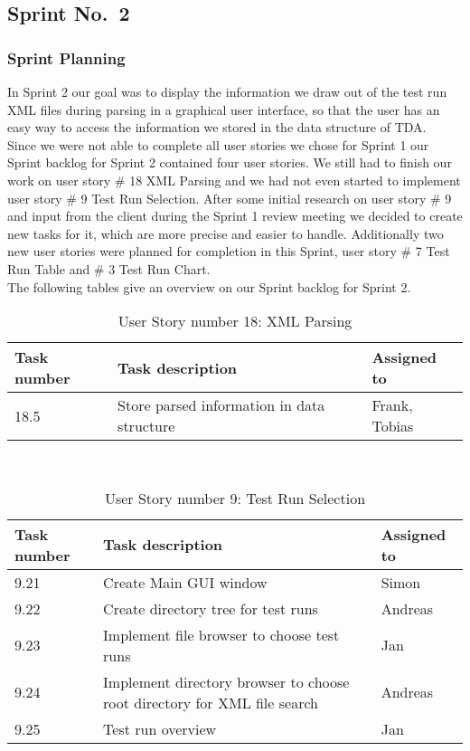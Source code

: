 \subsection{Sprint No.~2}

\subsubsection*{Sprint Planning}

In Sprint 2 our goal was to display the information we draw out of the test run XML files during parsing in a graphical user interface, so that the user has an easy way to access the information we stored in the data structure of TDA. \\ 
Since we were not able to complete all user stories we chose for Sprint 1 our Sprint backlog for Sprint 2 contained four user stories. We still had to finish our work on user story \# 18 XML Parsing and we had not even started to implement user story \# 9 Test Run Selection. After some initial research on user story \# 9 and input from the client during the Sprint 1 review meeting we decided to create new tasks for it, which are more precise and easier to handle. Additionally two new user stories were planned for completion in this Sprint, user story \# 7 Test Run Table and \# 3 Test Run Chart. \\ 
The following tables give an overview on our Sprint backlog for Sprint 2. \\ 

\newpage 

\begin{table}[h]
  \caption{User Story number 18: XML Parsing}
  \label{US_Parsing2}
  \centering
  \begin{tabular}{p{1.5cm}|p{9cm}|p{3cm}|}
  	Task number & Task description & Assigned to \\ 
  	\hline
  	\hline
  	18.5 & Store parsed information in data structure & Frank, Tobias \\ 
  	\hline
  \end{tabular}
\end{table} 

\ \\

\begin{table}[h]
  \caption{User Story number 9: Test Run Selection}
  \label{US_Selection2}
  \centering
  \begin{tabular}{p{1.5cm}|p{9cm}|p{3cm}|}
  	Task number & Task description & Assigned to \\ 
  	\hline
  	\hline
  	9.21 & Create Main GUI window & Simon \\ 
  	\hline
  	9.22 & Create directory tree for test runs & Andreas \\ 
  	\hline
  	9.23 & Implement file browser to choose test runs & Jan \\
  	\hline
  	9.24 & Implement directory browser to choose root directory for XML file search & Andreas \\
  	\hline
  	9.25 & Test run overview & Jan \\ 
  	\hline
  \end{tabular}
\end{table} 

